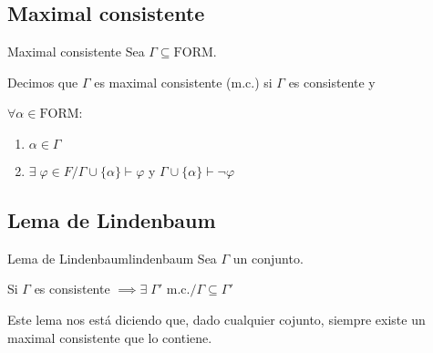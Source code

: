 \subsection{Maximal consistente}

\begin{definicion}{Maximal consistente}{}
    Sea $\Gamma \subseteq \mathrm{FORM}$.

    \medskip

    Decimos que $\Gamma$ es maximal consistente (m.c.) si $\Gamma$ es 
    consistente y 

    $\forall \alpha \in \mathrm{FORM}$:

    \begin{center}
    \begin{enumerate}[%
                    labelindent=*,
                    style=multiline,
                    leftmargin=*,
                    align=left,
                    leftmargin=2\parindent,
                    label=Caso \arabic*)]
        \item $\alpha \in \Gamma$
        \item $\exists\; \varphi \in F / \Gamma \cup \{\alpha\} \vdash \varphi$
        y $\Gamma \cup \{ \alpha \} \vdash \neg \varphi$
    \end{enumerate}
    \end{center}

\end{definicion}

\subsection{Lema de Lindenbaum}

\begin{lema}{Lema de Lindenbaum}{lindenbaum}
    Sea $\Gamma$ un conjunto.

    \medskip

    Si $\Gamma$ es consistente $\implies \exists \; \Gamma' \text{ m.c.}/
    \Gamma \subseteq \Gamma'$ 
\end{lema}


Este lema nos está diciendo que, dado cualquier cojunto, siempre existe un
maximal consistente que lo contiene.


